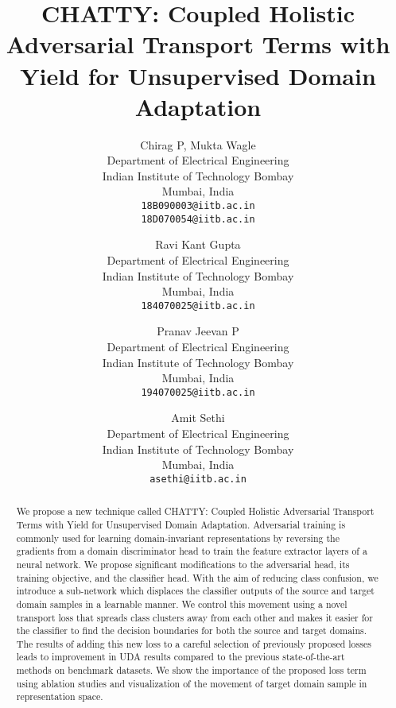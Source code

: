 \documentclass[10pt,twocolumn,letterpaper]{article}
\begin{document}
\title{CHATTY: Coupled Holistic Adversarial Transport Terms with Yield for Unsupervised Domain Adaptation}

\author{Chirag P, Mukta Wagle\\
Department of Electrical Engineering\\
Indian Institute of Technology Bombay\\
Mumbai, India\\
{\tt\small 18B090003@iitb.ac.in}\\
{\tt\small 18D070054@iitb.ac.in}
\and
Ravi Kant Gupta\\
Department of Electrical Engineering\\
Indian Institute of Technology Bombay\\
Mumbai, India\\
{\tt\small 184070025@iitb.ac.in}
\and
Pranav Jeevan P\\
Department of Electrical Engineering\\
Indian Institute of Technology Bombay\\
Mumbai, India\\
{\tt\small 194070025@iitb.ac.in}
\and
Amit Sethi\\
Department of Electrical Engineering\\
Indian Institute of Technology Bombay\\
Mumbai, India\\
{\tt\small asethi@iitb.ac.in}\\
}





\maketitle
\ificcvfinal\thispagestyle{empty}\fi

\begin{abstract}
   
We propose a new technique called CHATTY: Coupled Holistic Adversarial Transport Terms with Yield for Unsupervised Domain Adaptation. Adversarial training is commonly used for learning domain-invariant representations by reversing the gradients from a domain discriminator head to train the feature extractor layers of a neural network. We propose significant modifications to the adversarial head, its training objective, and the classifier head. With the aim of reducing class confusion, we introduce a sub-network which displaces the classifier outputs of the source and target domain samples in a learnable manner. We control this movement using a novel transport loss that spreads class clusters away from each other and makes it easier for the classifier to find the decision boundaries for both the source and target domains. The results of adding this new loss to a careful selection of previously proposed losses leads to improvement in UDA results compared to the previous state-of-the-art methods on benchmark datasets. We show the importance of the proposed loss term using ablation studies and visualization of the movement of target domain sample in representation space.

\end{abstract}
\end{document}
